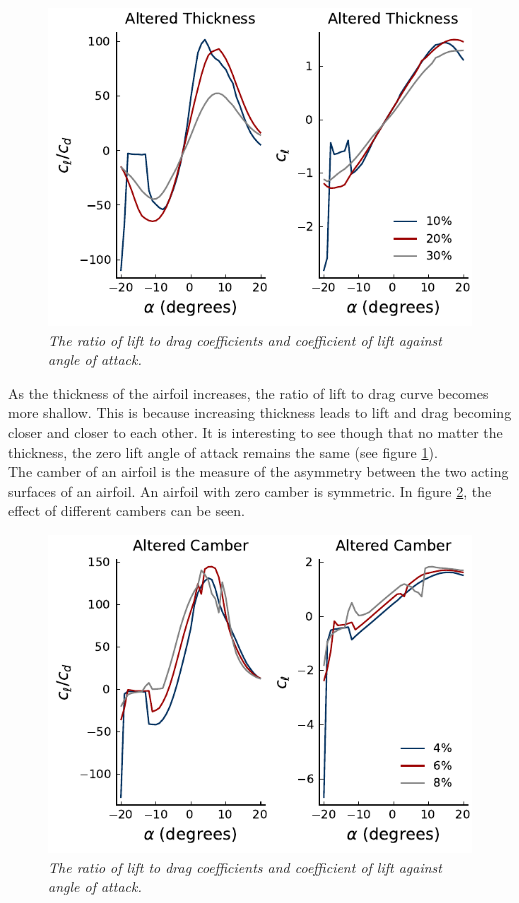 \documentclass{journal}
\begin{document}
	\begin{figure}[H]
		\centering
		\includegraphics{../graphics/altered-thickness.pdf}
		\caption{\emph{The ratio of lift to drag coefficients and coefficient of lift against angle of attack.}}
		\label{fig:altered-thickness}
	\end{figure}
	
	As the thickness of the airfoil increases, the ratio of lift to drag curve becomes more shallow. This is because increasing thickness leads to lift and drag becoming closer and closer to each other. It is interesting to see though that no matter the thickness, the zero lift angle of attack remains the same (see figure \ref{fig:altered-thickness}).\\
	
	The camber of an airfoil is the measure of the asymmetry between the two acting surfaces of an airfoil. An airfoil with zero camber is symmetric. In figure \ref{fig:altered-camber}, the effect of different cambers can be seen.\\
	
	\begin{figure}[H]
		\centering
		\includegraphics{../graphics/altered-camber.pdf}
		\caption{\emph{The ratio of lift to drag coefficients and coefficient of lift against angle of attack.}}
		\label{fig:altered-camber}
	\end{figure}
	
\end{document}

